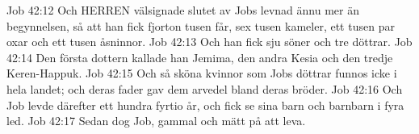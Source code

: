 Job 42:12  Och HERREN välsignade slutet av Jobs levnad ännu mer än begynnelsen, så att han fick fjorton tusen får, sex tusen kameler, ett tusen par oxar och ett tusen åsninnor.
Job 42:13  Och han fick sju söner och tre döttrar.
Job 42:14  Den första dottern kallade han Jemima, den andra Kesia och den tredje Keren-Happuk.
Job 42:15  Och så sköna kvinnor som Jobs döttrar funnos icke i hela landet; och deras fader gav dem arvedel bland deras bröder.
Job 42:16  Och Job levde därefter ett hundra fyrtio år, och fick se sina barn och barnbarn i fyra led.
Job 42:17  Sedan dog Job, gammal och mätt på att leva.


